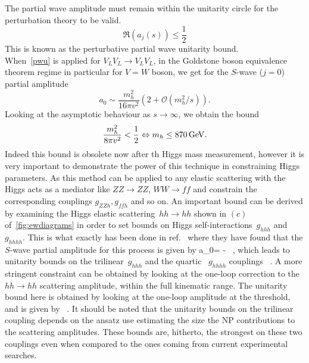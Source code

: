 The partial wave amplitude must  remain within the unitarity circle for the perturbation theory to be valid.
\begin{equation}
	\mathfrak{R} (a_j(s)) \leq \frac{1}{2}
	\label{pwu}
\end{equation}
This is known as the perturbative partial wave unitarity bound.  \\
When~\eqref{pwu} is applied for  $V_L V_L \to V_L V_L$, in the Goldstone boson equivalence theorem regime in particular for $V=W$ boson, we get for the $S$-wave ($j=0$) partial amplitude
\begin{equation}
	a_0 \sim \frac{m_h^2}{16 \pi  v^2} \left( 2+\mathcal{O} \left(m_h^2/s \right) \right) .
\end{equation}
Looking at the asymptotic behaviour as $ s \to \infty$, we obtain the bound
\begin{equation}
	\frac{m_h^2}{8 \pi v^2} < {1\over 2}  \Leftrightarrow  m_h \leq 870 \,\GeV.
\end{equation}
Indeed this bound is obsolete now after th Higgs mass measurement, however it is very important to demonstrate the power of this technique in constraining Higgs parameters. As this method can be applied to any elastic scattering with the Higgs acts as a mediator like $ZZ\to ZZ$, $WW \to ff$ and constrain the corresponding couplings $ g_{ZZh}, g_{f\bar f h}$ and so on. An important bound can be derived by examining the Higgs elastic scattering~$hh \to hh$ shown in $(c)$ of~\autoref{fig:ewdiagrams} in order to set bounds on Higgs self-interactions~$g_{hhh}$ and $g_{hhhh}$. This is what exactly has been done in ref.~\cite{DiLuzio:2017tfn}  where they have found that the $S$-wave partial amplitude for this process is given by
\beq 
\label{a0hhtohh}
a_0= -    \, ,
\eeq
which leads to unitarity bounds on the trilinear~$g_{hhh}$ and the quartic ~$g_{hhhh}$ couplings 
\beq
\label{unitaritybounds}
  
\qquad {} \qquad
{}  \, .
\eeq
A more stringent constraint can be obtained by looking at the one-loop correction to the $hh\to hh$ scattering amplitude, within the full kinematic range.
The unitarity bound here is obtained by looking at the one-loop  amplitude at the threshold, and is given by
\beq 
\label{pertboundhhhmax}
  \, .
\eeq
It should be noted that the unitarity bounds on the trilinear coupling depends on the ansatz use estimating the size the NP contributions to the scattering amplitudes.
These bounds are, hitherto, the strongest on these two couplings even when compared to the ones coming from current experimental searches. 
